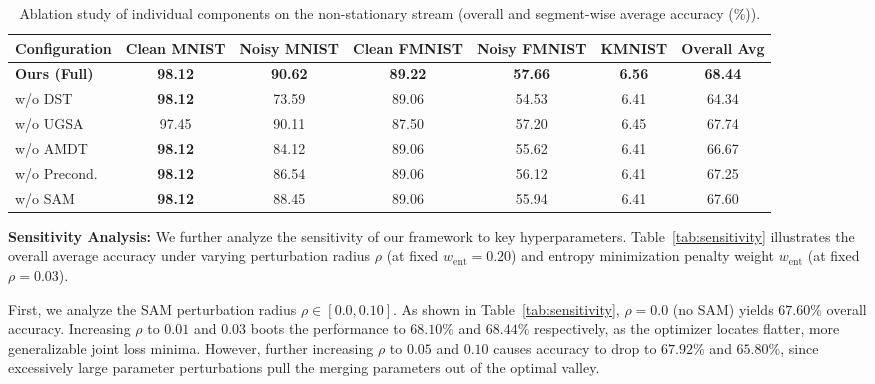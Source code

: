 \documentclass{article}
\theoremstyle{plain}
\theoremstyle{definition}
\theoremstyle{remark}
\begin{document}
\begin{table}[t]
\caption{Ablation study of individual components on the non-stationary stream (overall and segment-wise average accuracy (\%)).}
\label{tab:ablation}
\vskip 0.15in
\begin{center}
\begin{small}
\begin{sc}
\setlength{\tabcolsep}{4.0pt}
\begin{tabular}{lcccccc}
\toprule
Configuration & Clean MNIST & Noisy MNIST & Clean FMNIST & Noisy FMNIST & KMNIST & Overall Avg \\
\midrule
\textbf{Ours (Full)} & \textbf{98.12} & \textbf{90.62} & \textbf{89.22} & \textbf{57.66} & \textbf{6.56} & \textbf{68.44} \\
\quad w/o DST        & \textbf{98.12} & 73.59 & 89.06 & 54.53 & 6.41 & 64.34 \\
\quad w/o UGSA       & 97.45 & 90.11 & 87.50 & 57.20 & 6.45 & 67.74 \\
\quad w/o AMDT       & \textbf{98.12} & 84.12 & 89.06 & 55.62 & 6.41 & 66.67 \\
\quad w/o Precond.   & \textbf{98.12} & 86.54 & 89.06 & 56.12 & 6.41 & 67.25 \\
\quad w/o SAM        & \textbf{98.12} & 88.45 & 89.06 & 55.94 & 6.41 & 67.60 \\
\bottomrule
\end{tabular}
\end{sc}
\end{small}
\end{center}
\vskip -0.1in
\end{table}

\textbf{Sensitivity Analysis:} 
We further analyze the sensitivity of our framework to key hyperparameters. Table~\ref{tab:sensitivity} illustrates the overall average accuracy under varying perturbation radius $\rho$ (at fixed $w_{\text{ent}} = 0.20$) and entropy minimization penalty weight $w_{\text{ent}}$ (at fixed $\rho = 0.03$).

First, we analyze the SAM perturbation radius $\rho \in [0.0, 0.10]$. As shown in Table~\ref{tab:sensitivity}, $\rho = 0.0$ (no SAM) yields $67.60\%$ overall accuracy. Increasing $\rho$ to $0.01$ and $0.03$ boots the performance to $68.10\%$ and $68.44\%$ respectively, as the optimizer locates flatter, more generalizable joint loss minima. However, further increasing $\rho$ to $0.05$ and $0.10$ causes accuracy to drop to $67.92\%$ and $65.80\%$, since excessively large parameter perturbations pull the merging parameters out of the optimal valley.
\end{document}

